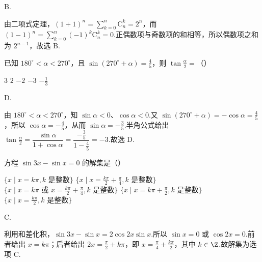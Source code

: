 \documentclass[UTF8,a4paper,oneside,11pt]{ctexbook}
\begin{document}
\begin{answer}
B.
\end{answer}

\begin{solution}
由二项式定理，\((1+1)^{n}=\sum_{k=0}^{n}\mathrm C_n^k=2^n\)，而 \((1-1)^n=\sum_{k=0}^{n}(-1)^k\mathrm C_n^k=0\).正偶数项与奇数项的和相等，所以偶数项之和为 \(2^{n-1}\)，故选 B.
\end{solution}

\begin{problem}

已知 \(180^{\circ} < \alpha < 270^{\circ} \)，且 \(\sin(270^{\circ} + \alpha) = \frac{4}{5} \)，则 \(\tan\frac{\alpha}{2} = \)（\quad）

\choicesfive
    {\(3\)}
    {\(2\)}
    {\(-2\)}
    {\(-3\)}
    {\(-\frac{1}{3} \)}
\end{problem}

\begin{answer}
D.
\end{answer}

\begin{solution}
由 \(180^\circ<\alpha<270^\circ\)，知 \(\sin\alpha<0\)、\(\cos\alpha<0\).又
\(\sin(270^\circ+\alpha)=-\cos\alpha=\frac45\)，所以 \(\cos\alpha=-\frac45\)，从而 \(\sin\alpha=-\frac35\).半角公式给出
\(\tan\frac\alpha2=\dfrac{\sin\alpha}{1+\cos\alpha}=\dfrac{-\frac{3}{5}}{1-\frac{4}{5}}=-3\).故选 D.
\end{solution}

\begin{problem}

方程 \(\sin 3x - \sin x = 0 \) 的解集是（\quad）

\choicesfive
    {\(\{x \mid x = k\pi, k \text{ 是整数}\} \)}
    {\(\{x \mid x = \frac{k\pi}{2} + \frac{\pi}{4}, k \text{ 是整数}\} \)}
    {\(\{x \mid x = k\pi \text{\ 或\ } x = \frac{k\pi}{2} + \frac{\pi}{4}, k \text{ 是整数}\} \)}
    {\(\{x \mid x = k\pi + \frac{\pi}{2}, k \text{ 是整数}\} \)}
    {\(\{x \mid x = \frac{k\pi}{2}, k \text{ 是整数}\} \)}
\end{problem}

\begin{answer}
C.
\end{answer}

\begin{solution}
利用和差化积，\(\sin3x-\sin x=2\cos2x\sin x\).所以 \(\sin x=0\) 或 \(\cos2x=0\).前者给出 \(x=k\pi\)；后者给出 \(2x=\frac\pi2+k\pi\)，即 \(x=\frac\pi4+\frac{k\pi}{2}\)，其中 \(k\in\Z\).故解集为选项 C.
\end{solution}
\end{document}

